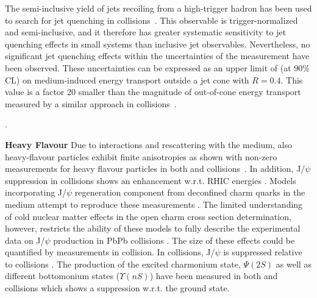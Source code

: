 \documentclass[../report.tex]{subfiles}
\begin{document}
The semi-inclusive yield of jets recoiling from a high-\pT trigger hadron has been used to search for jet quenching in \pPb collisions~\cite{Acharya:2017okq}. This observable is trigger-normalized and semi-inclusive, and it therefore has greater systematic sensitivity to jet quenching effects in small systems than inclusive jet observables. Nevertheless, no significant jet quenching effects within the uncertainties of the measurement have been observed. These uncertainties can be expressed as an upper limit of \unit[400]{\UMeV} (at 90\% CL) on medium-induced energy transport outside a jet cone with $R=0.4$. This value is a factor 20 smaller than the magnitude of out-of-cone energy transport measured by a similar approach in \PbPb collisions~\cite{Adam:2015doa}.

\cite{Aad:2010bu,Aamodt:2010jd,Chatrchyan:2011sx,CMS:2012aa,Abelev:2012hxa,ALICE:2012ab,Aad:2014bxa,Adam:2015ewa,Aad:2015wga,Adam:2016jfp,Adam:2016xbp,Sirunyan:2017jic,Sirunyan:2016fcs,Sirunyan:2018jqr,Sirunyan:2018jju,Sirunyan:2018qec,Sirunyan:2017qhf,Khachatryan:2016tfj,Sirunyan:2017bsd,Aaboud:2017bzv,Aaboud:2017eww}.

\textbf{Heavy Flavour}
Due to interactions and rescattering with the medium, also heavy-flavour particles exhibit finite anisotropies as shown with non-zero \vtwo measurements for heavy flavour particles in both \PbPb and \pPb collisions~\cite{ALICE:2013xna,Abelev:2013lca,Abelev:2014ipa,Adam:2015pga,Acharya:2017tfn,Adam:2016ssk,ALICE:2016clc,Acharya:2017qps,Sirunyan:2017plt,Acharya:2017tgv,Khachatryan:2016ypw,Acharya:2018dxy,Sirunyan:2018toe}. In addition, J/$\psi$ suppression in \PbPb collisions shows an enhancement w.r.t. RHIC energies \cite{Adam:2015isa}. Models incorporating J/$\psi$ regeneration component from deconfined charm quarks in the medium attempt to reproduce these measurements \cite{Abelev:2012rv,Adam:2015isa}. The limited understanding of cold nuclear matter effects in the open charm cross section determination, however, restricts the ability of these models to fully describe the experimental data on J/$\psi$ production in PbPb collisions \cite{Aaij:2017cqq}. The size of these effects could be quantified by measurements in \pPb collision. In \pPb collisions, J/$\psi$ is suppressed relative to \pp collisions \cite{Aaij:2017cqq}. The production of the excited charmonium state, $\Psi(2S)$ as well as different bottomonium states ($\Upsilon(nS)$) have been measured in both \PbPb and \pPb collisions \cite{Adam:2016ohd,Adam:2015isa,Aaboud:2017cif,Sirunyan:2016znt,Khachatryan:2016xxp} which shows a suppression w.r.t. the ground state. 
\end{document}

